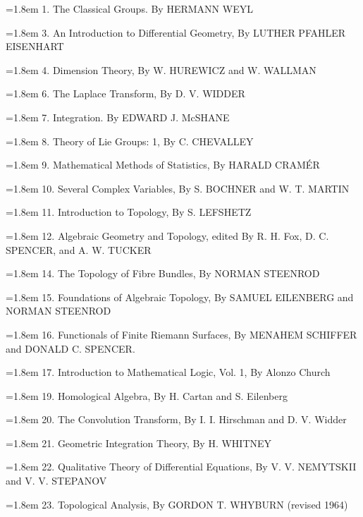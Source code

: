 {\parindent=0pt
\noindent\hangindent=1.8em
1. The Classical Groups. By HERMANN WEYL

\noindent\hangindent=1.8em
3. An Introduction to Differential Geometry, By LUTHER PFAHLER EISENHART

\noindent\hangindent=1.8em
4. Dimension Theory, By W. HUREWICZ and W. WALLMAN

\noindent\hangindent=1.8em
6. The Laplace Transform, By D. V. WIDDER

\noindent\hangindent=1.8em
7. Integration. By EDWARD J. McSHANE

\noindent\hangindent=1.8em
8. Theory of Lie Groups: 1, By C. CHEVALLEY

\noindent\hangindent=1.8em
9. Mathematical Methods of Statistics, By HARALD CRAM\'ER

\noindent\hangindent=1.8em
10. Several Complex Variables, By S. BOCHNER and W. T. MARTIN

\noindent\hangindent=1.8em
11. Introduction to Topology, By S. LEFSHETZ

\noindent\hangindent=1.8em
12. Algebraic Geometry and Topology, edited By R. H. Fox, D. C. SPENCER, and A. W. TUCKER

\noindent\hangindent=1.8em
14. The Topology of Fibre Bundles, By NORMAN STEENROD

\noindent\hangindent=1.8em
15. Foundations of Algebraic Topology, By SAMUEL EILENBERG and NORMAN STEENROD

\noindent\hangindent=1.8em
16. Functionals of Finite Riemann Surfaces, By MENAHEM SCHIFFER and DONALD C. SPENCER.

\noindent\hangindent=1.8em
17. Introduction to Mathematical Logic, Vol. 1, By Alonzo Church

\noindent\hangindent=1.8em
19. Homological Algebra, By H. Cartan and S. Eilenberg

\noindent\hangindent=1.8em
20. The Convolution Transform, By I. I. Hirschman and D. V. Widder

\noindent\hangindent=1.8em
21. Geometric Integration Theory, By H. WHITNEY

\noindent\hangindent=1.8em
22. Qualitative Theory of Differential Equations, By V. V. NEMYTSKII and V. V. STEPANOV

\noindent\hangindent=1.8em
23. Topological Analysis, By GORDON T. WHYBURN (revised 1964)

}
